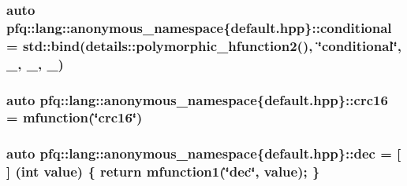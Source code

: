 \hypertarget{namespacepfq_1_1lang_1_1anonymous__namespace_02default_8hpp_03_a99247b15a4e37c0aaec60838716fc8dc}{
\subsubsection[{conditional}]{\setlength{\rightskip}{0pt plus 5cm}auto pfq\+::lang\+::anonymous\+\_\+namespace\{default.\+hpp\}\+::conditional = std\+::bind(details\+::polymorphic\+\_\+hfunction2(), \char`\"{}conditional\char`\"{}, \+\_, \+\_, \+\_)}}\label{namespacepfq_1_1lang_1_1anonymous__namespace_02default_8hpp_03_a99247b15a4e37c0aaec60838716fc8dc}
\hypertarget{namespacepfq_1_1lang_1_1anonymous__namespace_02default_8hpp_03_a358abfac3e7be63cbb4557616ab81f31}{
\subsubsection[{crc16}]{\setlength{\rightskip}{0pt plus 5cm}auto pfq\+::lang\+::anonymous\+\_\+namespace\{default.\+hpp\}\+::crc16 = {\bf mfunction}(\char`\"{}crc16\char`\"{})}}\label{namespacepfq_1_1lang_1_1anonymous__namespace_02default_8hpp_03_a358abfac3e7be63cbb4557616ab81f31}
\hypertarget{namespacepfq_1_1lang_1_1anonymous__namespace_02default_8hpp_03_a139906841e77a2eb86b761b27ceeb685}{
\subsubsection[{dec}]{\setlength{\rightskip}{0pt plus 5cm}auto pfq\+::lang\+::anonymous\+\_\+namespace\{default.\+hpp\}\+::dec = \mbox{[}$\,$\mbox{]} (int value) \{ return {\bf mfunction1}(\char`\"{}dec\char`\"{}, value); \}}}\label{namespacepfq_1_1lang_1_1anonymous__namespace_02default_8hpp_03_a139906841e77a2eb86b761b27ceeb685}
